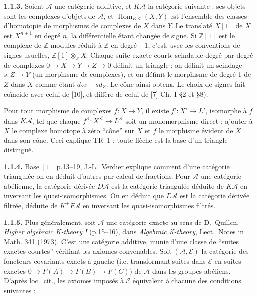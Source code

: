 \documentclass[12pt,a4paper]{article}
\theoremstyle{plain}
\theoremstyle{definition}
\theoremstyle{remark}
\DeclareMathOperator{\Hom}{Hom}
\newcommand{\ZZ}{\mathbb{Z}}
\newcommand{\cA}{\mathcal{A}}
\newcommand{\cE}{\mathcal{E}}
\begin{document}
\noindent
\textbf{1.1.3.} Soient $\cA$ une catégorie additive, et $K\cA$ la catégorie suivante : ses objets sont les complexes d'objets de $\cA$, et $\Hom_{K\cA}(X, Y)$ est l'ensemble des classes d'homotopie de morphismes de complexes de $X$ dans $Y$. Le translaté $X[1]$ de $X$ est $X^{n+1}$ en degré $n$, la différentielle étant changée de signe. Si $\ZZ[1]$ est le complexe de $\ZZ$-modules réduit à $\ZZ$ en degré $-1$, c'est, avec les conventions de signes usuelles, $\ZZ[1] \otimes_{\ZZ} X$. Chaque suite exacte courte scindable degré par degré de complexes $0 \to X \to Y \to Z \to 0$ définit un triangle : on définit un scindage $s : Z \to Y$ (un morphisme de complexes), et on définit le morphisme de degré 1 de $Z$ dans $X$ comme étant $d_{Y}s - sd_{Z}$. Le cône ainsi obtenu. Le choix de signes fait coïncide avec celui de [10], et diffère de celui de [7] Ch.~I §2 et §8).

Pour tout morphisme de complexes $f : X \to Y$, il existe $f' : X' \to L'$, isomorphe à $f$ dans $K\cA$, tel que chaque $f'^{i} : X'^{i} \to L'^{i}$ soit un monomorphisme direct : ajouter à $X$ le complexe homotope à zéro ``cône'' sur $X$ et $f$ le morphisme évident de $X$ dans son cône. Ceci explique TR~1 : toute flèche est la base d'un triangle distingué.

\medskip

\noindent
\textbf{1.1.4.} Base $[1]$ p.13--19, J.-L.~Verdier explique comment d'une catégorie triangulée on en déduit d'autres par calcul de fractions. Pour $\cA$ une catégorie abélienne, la catégorie dérivée $D\cA$ est la catégorie triangulée déduite de $K\cA$ en inversant les quasi-isomorphismes. On en déduit que $D\cA$ est la catégorie dérivée filtrée, déduite de $K^{+}F\cA$ en inversant les quasi-isomorphismes filtrés.

\medskip

\noindent
\textbf{1.1.5.} Plus généralement, soit $\cA$ une catégorie exacte au sens de D.~Quillen, \emph{Higher algebraic K-theory I} (p.15--16), dans \emph{Algebraic K-theory}, Lect.~Notes in Math. 341 (1973). C'est une catégorie additive, munie d'une classe de ``suites exactes courtes'' vérifiant les axiomes convenables. Soit $(\cA, \cE)$ la catégorie des foncteurs covariants exacts à gauche (i.e. transformant suites dans $\cE$ en suites exactes $0 \to F(A) \to F(B) \to F(C)$) de $\cA$ dans les groupes abéliens. D'après loc.~cit., les axiomes imposés à $\cE$ équivalent à chacune des conditions suivantes :

\medskip
\end{document}
